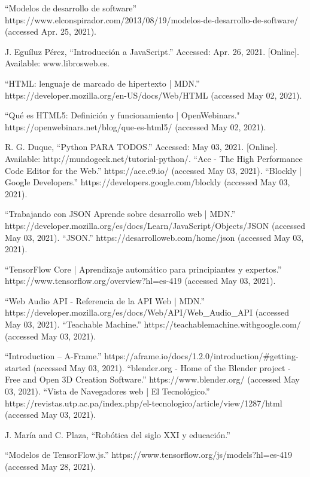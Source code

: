 \begin{thebibliography}{69}
 ``Modelos de desarrollo de software” https://www.elconspirador.com/2013/08/19/modelos-de-desarrollo-de-software/ (accessed Apr. 25, 2021).

 J. Eguíluz Pérez, “Introducción a JavaScript.” Accessed: Apr. 26, 2021. [Online]. Available: www.librosweb.es.


	``HTML: lenguaje de marcado de hipertexto | MDN.” https://developer.mozilla.org/en-US/docs/Web/HTML (accessed May 02, 2021).

 ``Qué es HTML5: Definición y funcionamiento | OpenWebinars." https://openwebinars.net/blog/que-es-html5/ (accessed May 02, 2021).


 R. G. Duque, ``Python PARA TODOS.” Accessed: May 03, 2021. [Online]. Available: http://mundogeek.net/tutorial-python/.
 ``Ace - The High Performance Code Editor for the Web.” https://ace.c9.io/ (accessed May 03, 2021).
 ``Blockly  |  Google Developers.” https://developers.google.com/blockly (accessed May 03, 2021).


 ``Trabajando con JSON \- Aprende sobre desarrollo web | MDN.” https://developer.mozilla.org/es/docs/Learn/JavaScript/Objects/JSON (accessed May 03, 2021).
 ``JSON.” https://desarrolloweb.com/home/json (accessed May 03, 2021).

 ``TensorFlow Core | Aprendizaje automático para principiantes y expertos.” https://www.tensorflow.org/overview?hl=es-419 (accessed May 03, 2021).

 ``Web Audio API - Referencia de la API Web | MDN.” https://developer.mozilla.org/es/docs/Web/API/Web\_Audio\_API (accessed May 03, 2021).
 ``Teachable Machine.” https://teachablemachine.withgoogle.com/ (accessed May 03, 2021).

 ``Introduction – A-Frame.” https://aframe.io/docs/1.2.0/introduction/\#getting-started (accessed May 03, 2021).
  ``blender.org - Home of the Blender project - Free and Open 3D Creation Software.” https://www.blender.org/ (accessed May 03, 2021).
 ``Vista de Navegadores web | El Tecnológico.” https://revistas.utp.ac.pa/index.php/el-tecnologico/article/view/1287/html (accessed May 03, 2021).

 J. María and C. Plaza, ``Robótica del siglo XXI y educación.”

 ``Modelos de TensorFlow.js.” https://www.tensorflow.org/js/models?hl=es-419 (accessed May 28, 2021).

\end{thebibliography}
